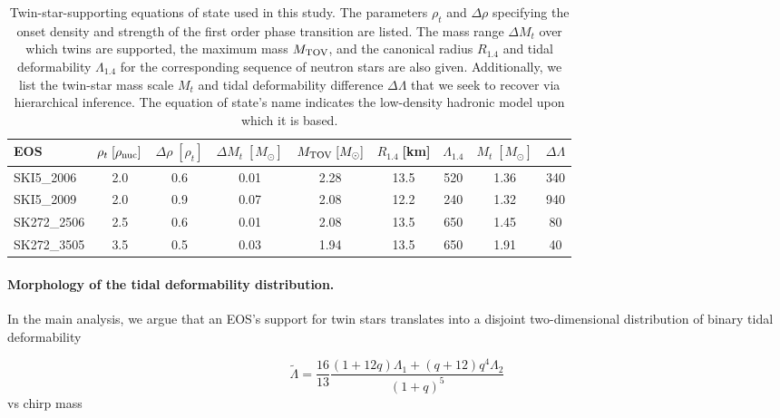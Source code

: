 \documentclass[aps,prl,twocolumn,superscriptaddress,footinbib]{revtex4-1}
\begin{document}
\begin{table}[tb]
    \centering
    \begin{tabular}{lcccccccc}
    \hline \hline
    EOS & $\rho_t\;[\rho_{\rm nuc}]$ & $\Delta\rho\;[\rho_{t}]$ & $\Delta M_{t}\;[M_{\odot}]$ & $M_{\rm TOV}\;[M_{\odot}]$ & $R_{1.4}\;$[km] & $\Lambda_{1.4}$ & $M_t\;[M_{\odot}]$ & $\Delta\Lambda$ \\ \hline    
     SKI5\_2006 & 2.0 & 0.6 & 0.01 & 2.28 & 13.5 & 520  & 1.36 & 340 \\
     SKI5\_2009 & 2.0 & 0.9 & 0.07 & 2.08 & 12.2 & 240 & 1.32 & 940 \\
     SK272\_2506 & 2.5 & 0.6 & 0.01 & 2.08 & 13.5 & 650 & 1.45 & 80 \\ 
     SK272\_3505 & 3.5 & 0.5 & 0.03 & 1.94 & 13.5 & 650 & 1.91 & 40 \\ \hline \hline
    \end{tabular}
    \caption{Twin-star-supporting equations of state used in this study. The parameters $\rho_t$ and $\Delta\rho$ specifying the onset density and strength of the first order phase transition are listed. The mass range $\Delta M_t$ over which twins are supported, the maximum mass $M_{\rm TOV}$, and the canonical radius $R_{1.4}$ and tidal deformability $\Lambda_{1.4}$ for the corresponding sequence of neutron stars are also given. Additionally, we list the twin-star mass scale $M_t$ and tidal deformability difference $\Delta\Lambda$ that we seek to recover via hierarchical inference. The equation of state's name indicates the low-density hadronic model upon which it is based.}
    \label{tab:eos}
\end{table}

\paragraph{Morphology of the tidal deformability distribution.}

In the main analysis, we argue that an EOS's support for twin stars translates into a disjoint two-dimensional distribution of binary tidal deformability

\begin{equation}
    \tilde{\Lambda} = \frac{16}{13} \frac{(1+12q) \Lambda_1 + (q+12)q^4\Lambda_2}{(1+q)^5}
\end{equation}
vs chirp mass
\end{document}
